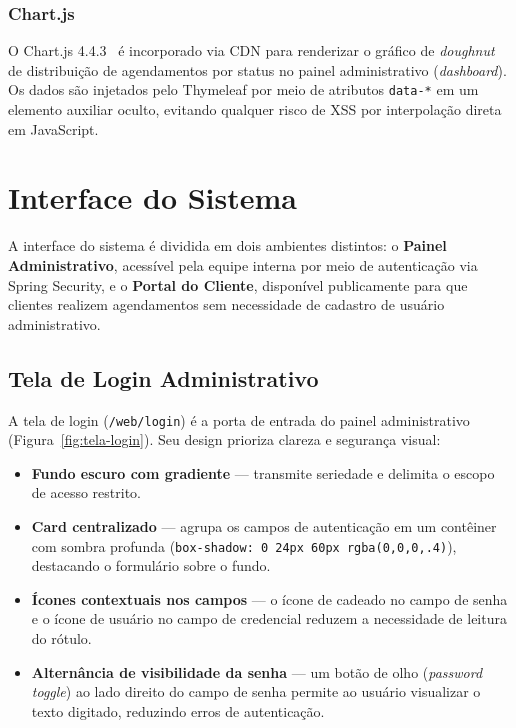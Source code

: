 \subsubsection{Chart.js}
O Chart.js 4.4.3~\cite{chartjs} é incorporado via CDN para renderizar o gráfico
de \textit{doughnut} de distribuição de agendamentos por status no painel
administrativo (\textit{dashboard}). Os dados são injetados pelo Thymeleaf por meio
de atributos \texttt{data-*} em um elemento auxiliar oculto, evitando qualquer
risco de XSS por interpolação direta em JavaScript.


\section{Interface do Sistema}

A interface do sistema é dividida em dois ambientes distintos: o
\textbf{Painel Administrativo}, acessível pela equipe interna por meio de
autenticação via Spring Security, e o \textbf{Portal do Cliente}, disponível
publicamente para que clientes realizem agendamentos sem necessidade de cadastro
de usuário administrativo.

\subsection{Tela de Login Administrativo}

A tela de login (\texttt{/web/login}) é a porta de entrada do painel
administrativo (Figura~\ref{fig:tela-login}). Seu design prioriza clareza e
segurança visual:

\begin{itemize}
  \item \textbf{Fundo escuro com gradiente} — transmite seriedade e delimita o
    escopo de acesso restrito.
  \item \textbf{Card centralizado} — agrupa os campos de autenticação em um
    contêiner com sombra profunda (\texttt{box-shadow: 0 24px 60px rgba(0,0,0,.4)}),
    destacando o formulário sobre o fundo.
  \item \textbf{Ícones contextuais nos campos} — o ícone de cadeado no campo de
    senha e o ícone de usuário no campo de credencial reduzem a necessidade de
    leitura do rótulo.
  \item \textbf{Alternância de visibilidade da senha} — um botão de olho
    (\textit{password toggle}) ao lado direito do campo de senha permite ao usuário
    visualizar o texto digitado, reduzindo erros de autenticação.
\end{itemize}

